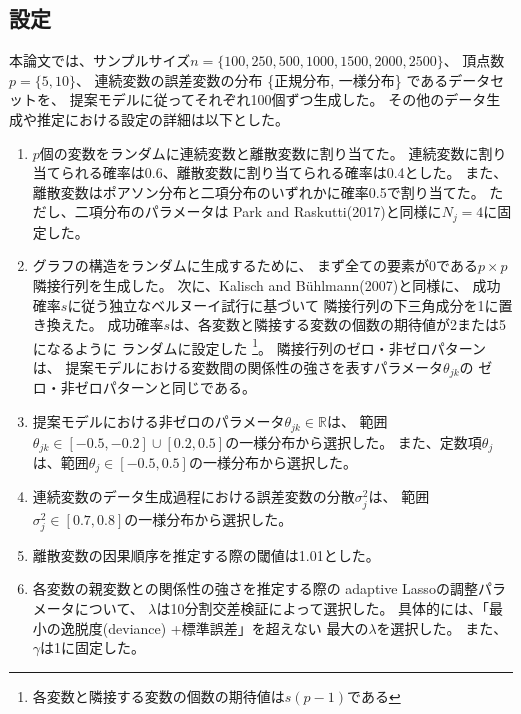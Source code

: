 
\subsection{設定}
\label{subsection:setup}

本論文では、サンプルサイズ$n = \{ 100, 250, 500, 1000, 1500, 2000, 2500 \}$、
頂点数$p = \{ 5, 10 \}$、
連続変数の誤差変数の分布 \{正規分布, 一様分布\} であるデータセットを、
提案モデルに従ってそれぞれ100個ずつ生成した。
その他のデータ生成や推定における設定の詳細は以下とした。

\begin{enumerate}
  \setlength{\itemsep}{0.3cm}
  \item
  $p$個の変数をランダムに連続変数と離散変数に割り当てた。
  連続変数に割り当てられる確率は0.6、離散変数に割り当てられる確率は0.4とした。
  また、離散変数はポアソン分布と二項分布のいずれかに確率0.5で割り当てた。
  ただし、二項分布のパラメータは
  Park and Raskutti(2017)\cite{Park2017-hw}と同様に$N_j=4$に固定した。

  \item
  グラフの構造をランダムに生成するために、
  まず全ての要素が0である$p\times p$隣接行列を生成した。
  次に、Kalisch and B\"{u}hlmann(2007)\cite{Kalisch2007-xg}と同様に、
  成功確率$s$に従う独立なベルヌーイ試行に基づいて
  隣接行列の下三角成分を1に置き換えた。
  成功確率$s$は、各変数と隣接する変数の個数の期待値が2または5になるように
  ランダムに設定した
  \footnote{各変数と隣接する変数の個数の期待値は$s(p-1)$である\cite{Kalisch2007-xg}}。
  隣接行列のゼロ・非ゼロパターンは、
  提案モデルにおける変数間の関係性の強さを表すパラメータ$\theta_{jk}$の
  ゼロ・非ゼロパターンと同じである。

  \item
  提案モデルにおける非ゼロのパラメータ$\theta_{jk} \in \mathbb R$は、
  範囲$\theta_{jk} \in [-0.5,-0.2]\cup [0.2,0.5]$の一様分布から選択した。
  また、定数項$\theta_j$は、範囲$\theta_j \in [-0.5,0.5]$の一様分布から選択した。

  \item
  連続変数のデータ生成過程における誤差変数の分散$\sigma_j^2$は、
  範囲$\sigma_j^2 \in [0.7,0.8]$の一様分布から選択した。

  \item
  離散変数の因果順序を推定する際の閾値は1.01とした。

  \item
  各変数の親変数との関係性の強さを推定する際の
  adaptive Lassoの調整パラメータについて、
  $\lambda$は10分割交差検証によって選択した。
  具体的には、「最小の逸脱度(deviance) +標準誤差」を超えない
  最大の$\lambda$を選択した。
  また、$\gamma$は1に固定した。
\end{enumerate}


